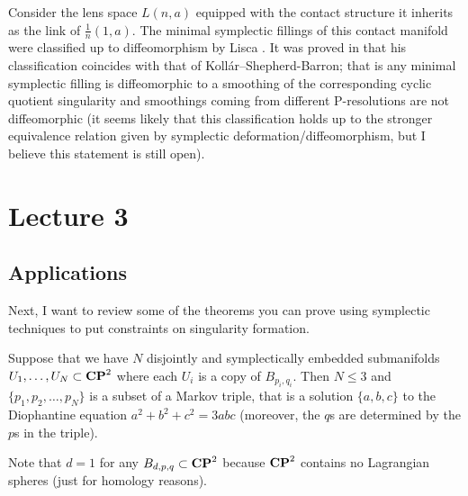 \documentclass{article}
\begin{document}
\begin{Remark}
Consider the lens space \(L(n,a)\) equipped with the contact
structure it inherits as the link of \(\frac{1}{n}(1,a)\). The
minimal symplectic fillings of this contact manifold were classified
up to diffeomorphism by Lisca \cite{Lisca}. It was proved in
\cite{NPP} that his classification coincides with that of
Koll\'{a}r--Shepherd-Barron; that is any minimal symplectic filling
is diffeomorphic to a smoothing of the corresponding cyclic quotient
singularity and smoothings coming from different P-resolutions are
not diffeomorphic (it seems likely that this classification holds up
to the stronger equivalence relation given by symplectic
deformation/diffeomorphism, but I believe this statement is still
open).


\end{Remark}
\newpage


\section{Lecture 3}




\subsection{Applications}


Next, I want to review some of the theorems you can prove using
symplectic techniques to put constraints on singularity formation.


\begin{Theorem}\label{thm:cp2es}
Suppose that we have \(N\) disjointly and symplectically embedded
submanifolds \(U_1,\ldots,U_N\subset\mathbf{CP}^{2}\) where each \(U_i\) is a
copy of \(B_{p_i,q_i}\). Then \(N\leq 3\) and
\(\{p_1,p_2,\ldots,p_N\}\) is a subset of a Markov triple, that is a
solution \(\{a,b,c\}\) to the Diophantine equation
\(a^2+b^2+c^2=3abc\) (moreover, the \(q\)s are determined by the
\(p\)s in the triple).


\end{Theorem}
Note that \(d=1\) for any \(B_{d,p,q}\subset\mathbf{CP}^{2}\) because
\(\mathbf{CP}^{2}\) contains no Lagrangian spheres (just for homology reasons).
\end{document}
